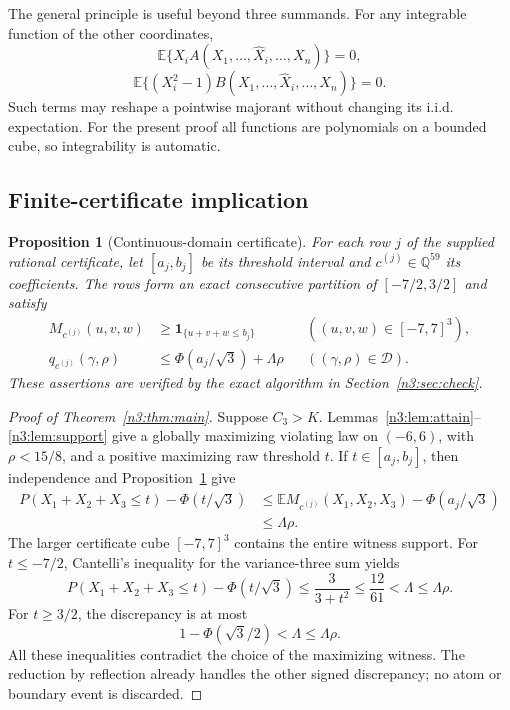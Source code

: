 \documentclass[11pt,a4paper]{article}
\numberwithin{equation}{section}
\newtheorem{proposition}[theorem]{Proposition}
\theoremstyle{definition}
\theoremstyle{remark}
\newcommand{\E}{\mathbb E}
\newcommand{\one}{\mathbf 1}
\begin{document}
The general principle is useful beyond three summands. For any integrable
function of the other coordinates,
\[
 \E\{X_i A(X_1,\ldots,\widehat X_i,\ldots,X_n)\}=0,
\]
\[
 \E\{(X_i^2-1)B(X_1,\ldots,\widehat X_i,\ldots,X_n)\}=0.
\]
Such terms may reshape a pointwise majorant without changing its i.i.d.
expectation. For the present proof all functions are polynomials on a
bounded cube, so integrability is automatic.

\subsection{Finite-certificate implication}
\begin{proposition}[Continuous-domain certificate]\label{n3:prop:certificate}
For each row $j$ of the supplied rational certificate, let $[a_j,b_j]$
be its threshold interval and $c^{(j)}\in\mathbb Q^{59}$ its coefficients.
The rows form an exact consecutive partition of $[-7/2,3/2]$ and satisfy
\begin{align}
 M_{c^{(j)}}(u,v,w)&\ge\one_{\{u+v+w\le b_j\}}
       &&((u,v,w)\in[-7,7]^3),\label{n3:eq:pointwise}\\
 q_{c^{(j)}}(\gamma,\rho)&\le
      \Phi(a_j/\sqrt3)+\Lambda\rho
       &&((\gamma,\rho)\in\mathcal D).\label{n3:eq:scalar}
\end{align}
These assertions are verified by the exact algorithm in Section~\ref{n3:sec:check}.
\end{proposition}

\begin{proof}[Proof of Theorem~\ref{n3:thm:main}]
Suppose $C_3>K$. Lemmas~\ref{n3:lem:attain}--\ref{n3:lem:support} give a globally
maximizing violating law on $(-6,6)$, with $\rho<15/8$, and a positive
maximizing raw threshold $t$.
If $t\in[a_j,b_j]$, then independence and Proposition~\ref{n3:prop:certificate}
give
\begin{align*}
 P(X_1+X_2+X_3\le t)-\Phi(t/\sqrt3)
 &\le\E M_{c^{(j)}}(X_1,X_2,X_3)-\Phi(a_j/\sqrt3)\\
 &\le\Lambda\rho.
\end{align*}
The larger certificate cube $[-7,7]^3$ contains the entire witness support.
For $t\le-7/2$, Cantelli's inequality for the variance-three sum yields
\[
 P(X_1+X_2+X_3\le t)-\Phi(t/\sqrt3)
 \le\frac3{3+t^2}\le\frac{12}{61}<\Lambda\le\Lambda\rho.
\]
For $t\ge3/2$, the discrepancy is at most
\[
 1-\Phi(\sqrt3/2)<\Lambda\le\Lambda\rho.
\]
All these inequalities contradict the choice of the maximizing witness.
The reduction by reflection already handles the other signed discrepancy;
no atom or boundary event is discarded.
\end{proof}
\end{document}

